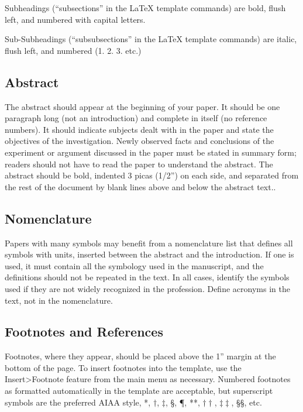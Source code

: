 \documentclass[conf]{new-aiaa}
\begin{document}
    Subheadings (``subsections'' in the \LaTeX{} template commands) are bold, flush left, and numbered with capital letters. 
    
    Sub-Subheadings (``subsubsections'' in the \LaTeX{} template commands) are italic, flush left, and numbered (1. 2. 3. etc.)
    
    \subsection{Abstract}
    
    The abstract should appear at the beginning of your paper. It should be one paragraph long (not an introduction) and complete in itself (no reference numbers). It should indicate subjects dealt with in the paper and state the objectives of the investigation. Newly observed facts and conclusions of the experiment or argument discussed in the paper must be stated in summary form; readers should not have to read the paper to understand the abstract. The abstract should be bold, indented 3 picas (1/2'') on each side, and separated from the rest of the document by blank lines above and below the abstract text..
    
    \subsection{Nomenclature}
    
    Papers with many symbols may benefit from a nomenclature list that defines all symbols with units, inserted between the abstract and the introduction. If one is used, it must contain all the symbology used in the manuscript, and the definitions should not be repeated in the text. In all cases, identify the symbols used if they are not widely recognized in the profession. Define acronyms in the text, not in the nomenclature.
    
    \subsection{Footnotes and References}
    
    Footnotes, where they appear, should be placed above the 1'' margin at the bottom of the page. To insert footnotes into the template, use the Insert>Footnote feature from the main menu as necessary. Numbered footnotes as formatted automatically in the template are acceptable, but superscript  symbols are the preferred AIAA style, *, $\dag$, $\ddag$, \S, \P, **, $\dag\dag$, $\ddag\ddag$, \S\S, etc.
    
\end{document}
